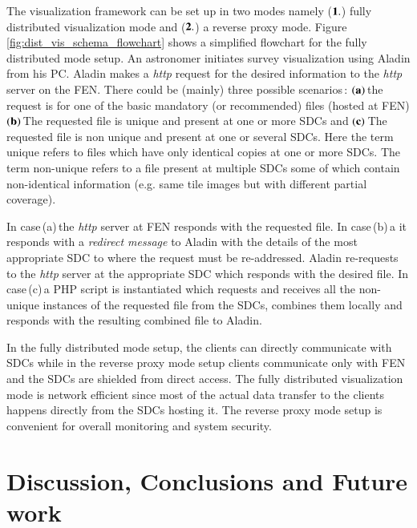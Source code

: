 \documentclass[11pt,twoside]{article}
\begin{document}
The visualization framework can be set up in two modes namely ($\bf{1.}$) fully distributed visualization mode and ($\bf{2.}$) a reverse proxy mode. Figure\,\ref{fig:dist_vis_schema_flowchart} shows a simplified flowchart for the fully distributed mode setup. An astronomer initiates survey visualization using Aladin from his PC. Aladin makes a {\it{http}} request for the desired information to the {\it{http}} server  on the FEN.  There could be (mainly) three possible  scenarios\,: ${\bf(a)}$\,the request is for one of the basic mandatory (or recommended) files (hosted at FEN) ${\bf(b)}$\,The requested file is unique and present at one or more SDCs and ${\bf(c)}$\,The requested file is non unique and present at one or several SDCs. Here the term unique refers to files which have only identical copies at one or more  SDCs. The term non-unique refers to a file present at multiple SDCs some of which contain non-identical information (e.g. same tile images but with different partial coverage). 

In case\,(a)\,the {\it http} server at FEN responds with the requested file. In case\,(b)\,a it responds with a {\it redirect message}  to Aladin with the details of the most appropriate SDC to where the request must be re-addressed. Aladin re-requests to the {\it{http}} server at the appropriate SDC which responds with the desired file. In case\,(c)\,a PHP script is instantiated which requests and receives all the non-unique instances of the requested file from the SDCs, combines them locally and responds with the resulting combined file to Aladin.  

In the fully distributed mode setup, the clients can directly communicate with SDCs while in the reverse proxy mode setup clients communicate only with FEN and the SDCs are shielded from direct access.   The fully distributed visualization mode  is network efficient since most of the actual data transfer to the clients happens  directly from the SDCs hosting it. The reverse proxy mode setup is convenient for overall monitoring and system security.

\section{Discussion, Conclusions and Future work}
\end{document}
